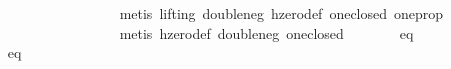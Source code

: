 \begin{isabellebody}
\ \ \ \ \isamarkupfalse%
\ \isamarkupfalse%
\ {}{}{}{}\ {}\ {}\ {}\ {}{}{}{}\ {}\ {}{}{}{}\isanewline
\ \ \ \ \ \ \isamarkupfalse%
\ {}metis\ {}lifting{}\ double{}neg\ hzero{}def\ one{}closed\ one{}prop{}\isanewline
\ \ \ \ \isamarkupfalse%
\ \isamarkupfalse%
\ {}{}{}{}\ {}\ {}{}\ {}\ {}{}{}\ {}\ {}{}{}\isanewline
\ \ \ \ \ \ \isamarkupfalse%
\ {}metis\ hzero{}def\ double{}neg\ one{}closed{}\isanewline
\ \ \ \ \isamarkupfalse%
\ \isamarkupfalse%
\ eq{}{}\ {}{}{}\ {}\ {}{}\ {}\ {}{}{}\ {}\ {}{}{}\ \isamarkupfalse%
\isanewline
\isanewline
\ \ \ \ \isamarkupfalse%
\ eq{}{}\ {}{}\ {}\ {}\ {}\ {}{}{}\ {}\ {}{}{}\isanewline

\end{isabellebody}
